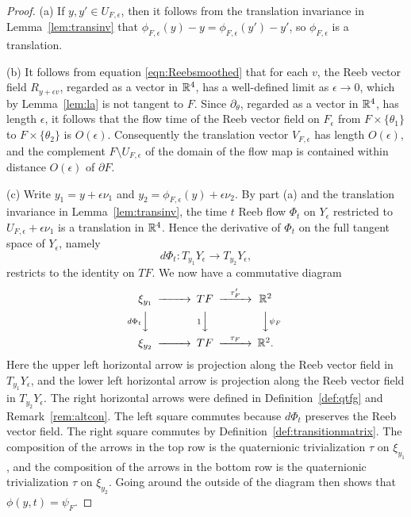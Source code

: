 \begin{proof}
(a) If $y,y'\in U_{F,\epsilon}$, then it follows from the translation invariance in Lemma~\ref{lem:transinv} that $\phi_{F,\epsilon}(y)-y=\phi_{F,\epsilon}(y')-y'$, so $\phi_{F,\epsilon}$ is a translation.

(b) It follows from equation \eqref{eqn:Reebsmoothed} that for each $v$, the Reeb vector field $R_{y+\epsilon v}$, regarded as a vector in ${\mathbb R}^4$, has a well-defined limit as $\epsilon\to 0$, which by Lemma~\ref{lem:la} is not tangent to $F$. Since $\partial_\theta$, regarded as a vector in ${\mathbb R}^4$, has length $\epsilon$, it follows that the flow time of the Reeb vector field on $F_\epsilon$ from $F\times\{\theta_1\}$ to $F\times\{\theta_2\}$ is $O(\epsilon)$. Consequently the translation vector $V_{F,\epsilon}$ has length $O(\epsilon)$, and the complement $F\setminus U_{F,\epsilon}$ of the domain of the flow map is contained within distance $O(\epsilon)$ of $\partial F$.

(c) Write $y_1=y+\epsilon\nu_1$ and $y_2=\phi_{F,\epsilon}(y)+\epsilon\nu_2$. By part (a) and the translation invariance in Lemma~\ref{lem:transinv}, the time $t$ Reeb flow $\Phi_t$ on $Y_\epsilon$ restricted to $U_{F,\epsilon} + \epsilon \nu_1$ is a translation in ${\mathbb R}^4$.
Hence the derivative of $\Phi_t$ on the full tangent space of $Y_\epsilon$, namely
\[
d\Phi_t: T_{y_1}Y_\epsilon \longrightarrow T_{y_2}Y_\epsilon,
\]
restricts to the identity on $TF$. We now have a commutative diagram
\[
\begin{CD}
\xi_{y_1} @>>> TF @>{\tau_F'}>> \R^2 \\
@V{d\Phi_t}VV @V{1}VV @VV{\psi_F}V \\
\xi_{y_2} @>>> TF @>{\tau_F}>> \R^2.
\end{CD}
\]
Here the upper left horizontal arrow is projection along the Reeb vector field in $T_{y_1}Y_\epsilon$, and the lower left horizontal arrow is projection along the Reeb vector field in $T_{y_2}Y_\epsilon$. The right horizontal arrows were defined in Definition~\ref{def:qtfg} and Remark~\ref{rem:altcon}. The left square commutes because $d\Phi_t$ preserves the Reeb vector field. The right square commutes by Definition~\ref{def:transitionmatrix}. The composition of the arrows in the top row is the quaternionic trivialization $\tau$ on $\xi_{y_1}$, and the composition of the arrows in the bottom row is the quaternionic trivialization $\tau$ on $\xi_{y_2}$. Going around the outside of the diagram then shows that $\phi(y,t)=\psi_F$.


\end{proof}
